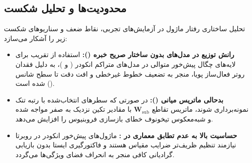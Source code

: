\subsection{محدودیت‌ها و تحلیل شکست}
تحلیل ساختاری رفتار ماژول  در آزمایش‌های تجربی، نقاط ضعف و سناریوهای شکست زیر را آشکار می‌سازد:
\begin{itemize}
    \item \textbf{رانش توزیع در مدل‌های بدون ساختار صریح خبره ():} استفاده از تقریب  برای لایه‌های چگال پیش‌خور متوالی در مدل‌های متراکم انکودر ( و )، به دلیل فقدان روتر فعال‌ساز پویا، منجر به تضعیف خطوط غیرخطی  و افت دقت تا سطح شانس () شده است.
    \item \textbf{بدحالی ماتریس میانی ():} در صورتی که سطرهای انتخاب‌شده با رتبه تنک نمونه‌برداری شوند، ماتریس تقاطع $\mathbf{W}_{\text{sub}}$ با مقادیر تکین نزدیک به صفر مواجه شده و شبه‌معکوس تیخونوف خطای بازسازی فروبنیوس را افزایش می‌دهد.
    \item \textbf{حساسیت بالا به عدم تطابق معماری در :} ماژول‌های پیش‌خور انکودر در روبرتا نیازمند تنظیم ظریف‌تر ضرایب مقیاس هستند و فاکتورگیری ایستا بدون بازیابی گرادیانی کافی منجر به انحراف فضای ویژگی‌ها می‌گردد.
\end{itemize}
